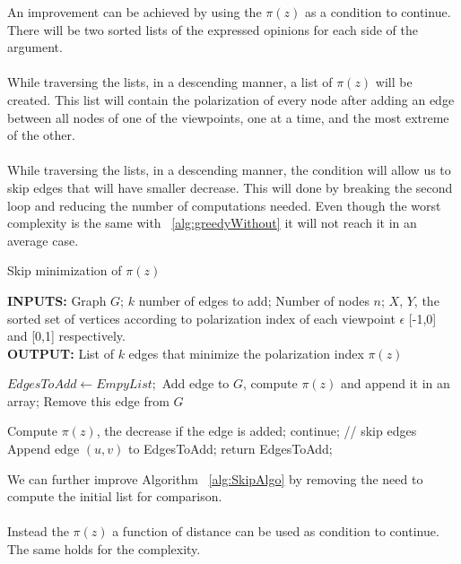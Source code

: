 \clearpage



\noindent An improvement can be achieved by using the $\pi(z)$ as a condition to continue. There will be two sorted lists of the expressed opinions for each side of the argument.
\\
\\
While traversing the lists, in a descending manner, a list of $\pi(z)$ will be created. This list will contain the polarization of every node after adding an edge between all nodes of one of the viewpoints, one at a time, and the most extreme of the other. 
\\
\\
While traversing the lists, in a descending manner, the condition will allow us to skip edges that will have smaller decrease. This will done by breaking the second loop and reducing the number of computations needed. Even though the worst complexity is the same with ~\ref{alg:greedyWithout} it will not reach it in an average case.

\begin{algorithm}[htbp]
	\caption{Skip minimization of $\pi(z)$}
	\label{alg:SkipAlgo}
	\begin{flushleft}
        		\textbf{INPUTS:} Graph $G$; $k$ number of edges to add; Number of nodes $n$;
		$X$, $Y $, the sorted set of vertices according to polarization index of each viewpoint $\epsilon$ [-1,0] and [0,1] respectively.\\
		\vspace{6pt}
        		\textbf{OUTPUT:} List of $k$ edges that minimize the polarization index $\pi(z)$
	\end{flushleft}
	\begin{algorithmic}[1]
		\STATE $EdgesToAdd \leftarrow Empy List;$
		\STATE Add edge to $G$, compute $\pi(z)$ and append it in an array;
		\STATE Remove this edge from $G$
		\ENDFOR
		
		\STATE Compute $\pi(z)$, the decrease if the edge is added;
			\STATE continue; // skip edges
		\ENDIF
		\STATE Append edge $(u,v)$ to EdgesToAdd;
			\STATE return EdgesToAdd;
		\ENDIF
		\ENDFOR
	\end{algorithmic}
\end{algorithm}
\clearpage

\noindent We can further improve  Algorithm ~\ref{alg:SkipAlgo} by removing the need to compute the initial list for comparison. 
\\
\\
Instead the $\pi(z)$ a function of distance can be used as condition to continue. The same holds for the complexity.
\\
\\

